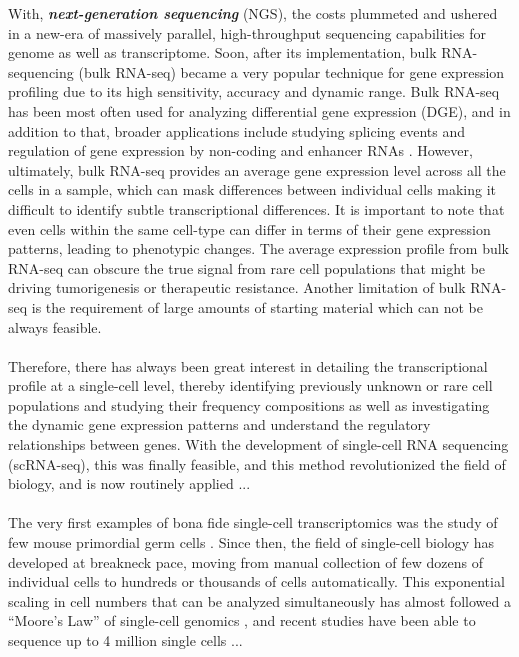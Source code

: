 With, \textbf{\textit{next-generation sequencing}} (NGS), the costs plummeted and ushered in a new-era of massively parallel, high-throughput sequencing capabilities for genome as well as transcriptome. Soon, after its implementation, bulk RNA-sequencing (bulk RNA-seq) became a very popular technique for gene expression profiling due to its high sensitivity, accuracy and dynamic range. Bulk RNA-seq has been most often used for analyzing differential gene expression (DGE), and in addition to that, broader applications include studying splicing events and regulation of gene expression by non-coding and enhancer RNAs \textbf{\cite{stark_rna_2019}}. However, ultimately, bulk RNA-seq provides an average gene expression level across all the cells in a sample, which can mask differences between individual cells making it difficult to identify subtle transcriptional differences. It is important to note that even cells within the same cell-type can differ in terms of their gene expression patterns, leading to phenotypic changes. The average expression profile from bulk RNA-seq can obscure the true signal from rare cell populations that might be driving tumorigenesis or therapeutic resistance. Another limitation of bulk RNA-seq is the requirement of large amounts of starting material which can not be always feasible.\\\\
Therefore, there has always been great interest in detailing the transcriptional profile at a single-cell level, thereby identifying previously unknown or rare cell populations and studying their frequency compositions as well as investigating the dynamic gene expression patterns and understand the regulatory relationships between genes. With the development of single-cell RNA sequencing (scRNA-seq), this was finally feasible, and this method revolutionized the field of biology, and is now routinely applied ... \\\\
The very first examples of bona fide single-cell transcriptomics was the study of few mouse primordial germ cells \textbf{\cite{tang_mrna-seq_2009}}. Since then, the field of single-cell biology has developed at breakneck pace, moving from manual collection of few dozens of individual cells to hundreds or thousands of cells automatically. This exponential scaling in cell numbers that can be analyzed simultaneously has almost followed a “Moore’s Law” of single-cell genomics \textbf{\cite{aldridge_single_2020}}, and recent studies have been able to sequence up to 4 million single cells ... 


